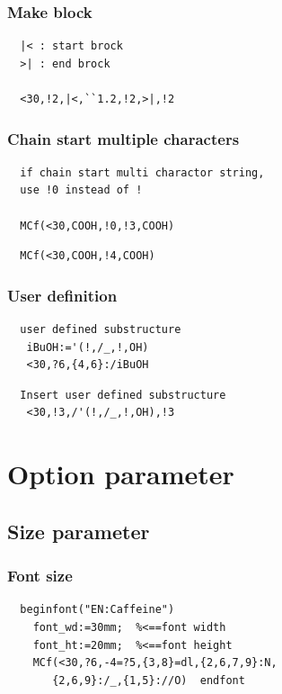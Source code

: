 \documentclass[a4paper]{article}
\makeatletter
\def\MCFstructure{\hspace{5mm}{\@strufont\char\fontnum}\advance\fontnum\@ne\relax}%
\makeatother
\begin{document}
\subsubsection{Make block}
\begin{verbatim}
  |< : start brock
  >| : end brock

  <30,!2,|<,``1.2,!2,>|,!2
\end{verbatim}
\MCFstructure
\subsubsection{Chain start multiple characters}
\begin{verbatim}
  if chain start multi charactor string,
  use !0 instead of !

  MCf(<30,COOH,!0,!3,COOH)
\end{verbatim}
\MCFstructure
\begin{verbatim}
  MCf(<30,COOH,!4,COOH)
\end{verbatim}
\MCFstructure
\subsubsection{User definition}
\begin{verbatim}
  user defined substructure
   iBuOH:='(!,/_,!,OH)
   <30,?6,{4,6}:/iBuOH
\end{verbatim}
\MCFstructure
\begin{verbatim}
  Insert user defined substructure
   <30,!3,/'(!,/_,!,OH),!3
\end{verbatim}
\MCFstructure
\newpage
\section{Option parameter}
\subsection{Size parameter}
\subsubsection{Font size}
\begin{verbatim}
  beginfont("EN:Caffeine")
    font_wd:=30mm;  %<==font width
    font_ht:=20mm;  %<==font height
    MCf(<30,?6,-4=?5,{3,8}=dl,{2,6,7,9}:N,
       {2,6,9}:/_,{1,5}://O)  endfont
\end{verbatim}
\MCFstructure
\end{document}
